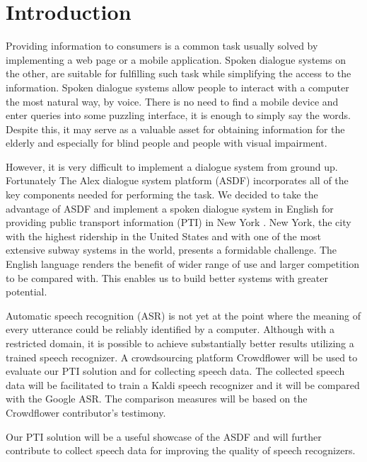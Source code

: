 \chapter*{Introduction}

Providing information to consumers is a common task usually solved by implementing a web page or a mobile application.
Spoken dialogue systems on the other, are suitable for fulfilling such task while simplifying the access to the information.
Spoken dialogue systems allow people to interact with a computer the most natural way, by voice.
There is no need to find a mobile device and enter queries into some puzzling interface, it is enough to simply say the words.
Despite this, it may serve as a valuable asset for obtaining information for the elderly and especially for blind people and people with visual impairment.%

However, it is very difficult to implement a dialogue system from ground up.
Fortunately The Alex dialogue system platform (ASDF) incorporates all of the key components needed for performing the task.
We decided to take the advantage of ASDF and implement a spoken dialogue system in English for providing public transport information (PTI) in New York .
New York, the city with the highest ridership in the United States and with one of the most extensive subway systems in the world, presents a formidable challenge.
The English language renders the benefit of wider range of use and larger competition to be compared with.
This enables us to build better systems with greater potential.

Automatic speech recognition (ASR) is not yet at the point where the meaning of every utterance could be reliably identified by a computer.
Although with a restricted domain, it is possible to achieve substantially better results utilizing a trained speech recognizer.
A crowdsourcing platform Crowdflower will be used to evaluate our PTI solution and for collecting speech data.
The collected speech data will be facilitated to train a Kaldi speech recognizer and it will be compared with the Google ASR.
The comparison measures will be based on the Crowdflower contributor's testimony. %

Our PTI solution will be a useful showcase of the ASDF and will further contribute to collect speech data for improving the quality of speech recognizers.

